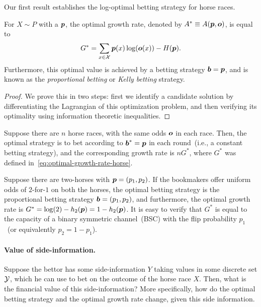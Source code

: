     Our first result establishes the log-optimal betting strategy for horse races. 
    \begin{theorem}
        \label{theorem:prop-betting-horse-races} For $X \sim P$ with a \pmf $\boldsymbol{p}$, the optimal growth rate, denoted by $A^* \equiv A(\boldsymbol{p}, \boldsymbol{o})$, is equal to 
        \begin{align}
            G^* = \sum_{x \in \mathcal{X}} \boldsymbol{p}(x) \log( \boldsymbol{o}(x)) - H(\boldsymbol{p}). \label{eq:optimal-growth-rate-horse}
        \end{align}
        Furthermore, this optimal value is achieved by a betting strategy $\boldsymbol{b}=\boldsymbol{p}$, and is known as the \emph{proportional betting} or \emph{Kelly betting} strategy.  
    \end{theorem}
    \begin{proof}
        We prove this in two steps: first we identify a candidate solution by differentiating the Lagrangian of this optimization problem, and then verifying its optimality using information theoretic inequalities. 

    \end{proof}

    \begin{corollary}
        \label{corollary:iid-horse-races} Suppose there are $n$ \iid horse races, with the same odds $\boldsymbol{o}$ in each race. Then, the optimal strategy is to bet according to $\boldsymbol{b}^* = \boldsymbol{p}$ in each round~(i.e., a constant betting strategy), and the corresponding growth rate is $n G^*$, where $G^*$ was defined in~\eqref{eq:optimal-growth-rate-horse}. 
    \end{corollary}

    \begin{example}
        \label{example:two-horses} Suppose there are two-horses with $\boldsymbol{p} = (p_1, p_2)$. If the bookmakers offer uniform odds of $2$-for-$1$ on both the horses, the optimal betting strategy is the proportional betting strategy $\boldsymbol{b} = (p_1, p_2)$, and furthermore, the optimal growth rate is $G^* = \log(2) - h_2(\boldsymbol{p}) = 1- h_2(\boldsymbol{p})$. It is easy to verify that $G^*$ is equal to the capacity of a binary symmetric channel~(BSC) with the flip probability $p_1$~(or equivalently $p_2=1-p_1$).  
    \end{example}

    \paragraph{Value of side-information.} Suppose the bettor has some  side-information $Y$ taking values in some discrete set $\mathcal{Y}$, which he can use to bet on the outcome of the horse race $X$. Then, what is the financial value of this side-information? More specifically, how do the optimal betting strategy and the optimal growth rate change, given this side information. 

